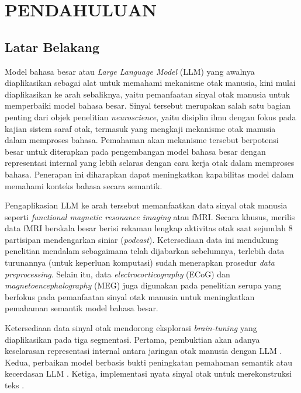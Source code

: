 \cleardoublepage %
\chapter{PENDAHULUAN}
\label{chap:pendahuluan}
\section{Latar Belakang}
\label{chap:pd_latbel}
Model bahasa besar atau \textit{Large Language Model} (LLM) yang awalnya diaplikasikan sebagai alat untuk memahami mekanisme otak manusia, kini mulai diaplikasikan ke arah sebaliknya, yaitu pemanfaatan sinyal otak manusia untuk memperbaiki model bahasa besar. Sinyal tersebut merupakan salah satu bagian penting dari objek penelitian \textit{neuroscience}, yaitu disiplin ilmu dengan fokus pada kajian sistem saraf otak, termasuk yang mengkaji mekanisme otak manusia dalam memproses bahasa. Pemahaman akan mekanisme tersebut berpotensi besar untuk diterapkan pada pengembangan model bahasa besar dengan representasi internal yang lebih selaras dengan cara kerja otak dalam memproses bahasa. Penerapan ini diharapkan dapat meningkatkan kapabilitas model dalam memahami konteks bahasa secara semantik.

Pengaplikasian LLM ke arah tersebut memanfaatkan data sinyal otak manusia seperti \textit{functional magnetic resonance imaging} atau fMRI. Secara khusus, \textcite{lebel2023natural} merilis data fMRI berskala besar berisi rekaman lengkap aktivitas otak saat sejumlah 8 partisipan mendengarkan siniar (\textit{podcast}). Ketersediaan data ini mendukung penelitian mendalam sebagaimana telah dijabarkan sebelumnya, terlebih data turunannya (untuk keperluan komputasi) sudah menerapkan prosedur \textit{data preprocessing}. Selain itu, data \textit{electrocorticography} (ECoG) dan \textit{magnetoencephalography} (MEG) juga digunakan pada penelitian serupa yang berfokus pada pemanfaatan sinyal otak manusia untuk meningkatkan pemahaman semantik model bahasa besar. 

Ketersediaan data sinyal otak mendorong eksplorasi \textit{brain-tuning} yang diaplikasikan pada tiga segmentasi. Pertama, pembuktian akan adanya keselarasan representasi internal antara jaringan otak manusia dengan LLM \autocite{goldstein2022shared, schrimpf2021neural, mischler2024contextual, yu2024predicting}. Kedua, perbaikan model berbasis bukti peningkatan pemahaman semantik atau kecerdasan LLM \autocite{schwartz2019inducing, moussa2026generalizability, moussa2025improving, negi2025brain, xiao2026beyond}. Ketiga, implementasi nyata sinyal otak untuk merekonstruksi teks \autocite{Tang2023858}.

